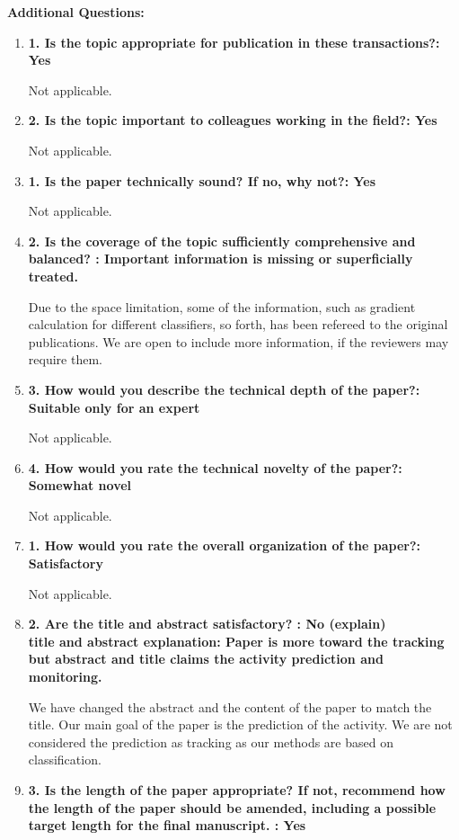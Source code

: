 \documentclass[12pt]{article}
\begin{document}
\textbf{Additional Questions:}

\begin{enumerate}

\item \textbf{1. Is the topic appropriate for publication in these transactions?: Yes}

Not applicable. 

\item \textbf{2. Is the topic important to colleagues working in the field?: Yes}

Not applicable.

\item \textbf{1. Is the paper technically sound? If no, why not?: Yes}

Not applicable.

\item \textbf{2. Is the coverage of the topic sufficiently comprehensive and balanced? : 
Important information is missing or superficially treated.}

Due to the space limitation, some of the information, such as gradient calculation for 
different classifiers, so forth, has been refereed to the original publications. We are 
open to include more information, if the reviewers may require them. 

\item \textbf{3. How would you describe the technical depth of the paper?: Suitable only 
for an expert}

Not applicable.

\item \textbf{4. How would you rate the technical novelty of the paper?: Somewhat novel}

Not applicable.

\item \textbf{1. How would you rate the overall organization of the paper?: Satisfactory}

Not applicable.

\item \textbf{2. Are the title and abstract satisfactory? : No (explain) \\
title and abstract explanation: Paper is more toward the tracking but abstract and title 
claims the activity prediction and monitoring.}

We have changed the abstract and the content of the paper to match the title. Our main 
goal of the paper is the prediction of the activity. We are not considered the prediction 
as tracking as our methods are based on classification.  

\item \textbf{3. Is the length of the paper appropriate? If not, recommend how the length 
of the paper should be amended, including a possible target length for the final 
manuscript. : Yes}

\end{enumerate}
\end{document}
